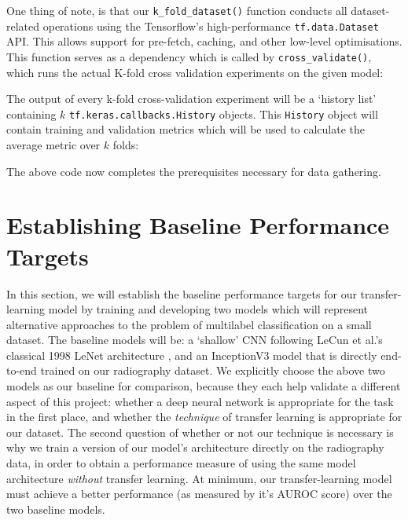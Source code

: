 

\noindent
One thing of note, is that our \texttt{k_fold_dataset()} function conducts all dataset-related operations using the Tensorflow's high-performance \texttt{tf.data.Dataset} API. This allows support for pre-fetch, caching, and other low-level optimisations. This function serves as a dependency which is called by \texttt{cross_validate()}, which runs the actual K-fold cross validation experiments on the given model:



\noindent
The output of every k-fold cross-validation experiment will be a \enquote*{history list} containing \(k\) \texttt{tf.keras.callbacks.History} objects. This \texttt{History} object will contain training and validation metrics which will be used to calculate the average metric over \(k\) folds:




\noindent
The above code now completes the prerequisites necessary for data gathering.

\section{Establishing Baseline Performance Targets}

In this section, we will establish the baseline performance targets for our transfer-learning model by training and developing two models which will represent alternative approaches to the problem of multilabel classification on a small dataset. The baseline models will be: a \enquote*{shallow} CNN following LeCun et al.'s classical 1998 LeNet architecture \autocite{lenet1998}, and an InceptionV3 model that is directly end-to-end trained on our radiography dataset. We explicitly choose the above two models as our baseline for comparison, because they each help validate a different aspect of this project: whether a deep neural network is appropriate for the task in the first place, and whether the \emph{technique} of transfer learning is appropriate for our dataset. The second question of whether or not our technique is necessary is why we train a version of our model's architecture directly on the radiography data, in order to obtain a performance measure of using the same model architecture \emph{without} transfer learning. At minimum, our transfer-learning model must achieve a better performance (as measured by it's AUROC score) over the two baseline models.

